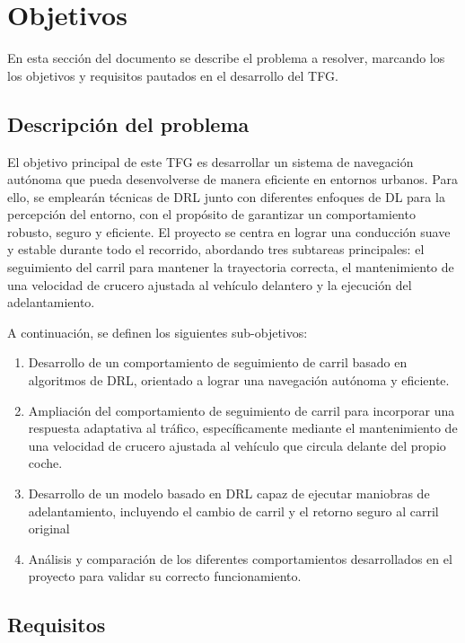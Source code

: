 \chapter{Objetivos}
\label{cap:capitulo2}

En esta sección del documento se describe el problema a resolver, marcando los los objetivos y requisitos pautados en el desarrollo del \ac{TFG}.

\section{Descripción del problema}
\label{sec:descripcion}

El objetivo principal de este \ac{TFG} es desarrollar un sistema de navegación autónoma que pueda desenvolverse de manera eficiente en entornos urbanos. Para ello, se emplearán técnicas de \ac{DRL} junto con diferentes enfoques de \ac{DL} para la percepción del entorno, con el propósito de garantizar un comportamiento robusto, seguro y eficiente. El proyecto se centra en lograr una conducción suave y estable durante todo el recorrido, abordando tres subtareas principales: el seguimiento del carril para mantener la trayectoria correcta, el mantenimiento de una velocidad de crucero ajustada al vehículo delantero y la ejecución del adelantamiento.

A continuación, se definen los siguientes sub-objetivos: 

\begin{enumerate}
    \item Desarrollo de un comportamiento de seguimiento de carril basado en algoritmos de \ac{DRL}, orientado a lograr una navegación autónoma y eficiente.
    \item Ampliación del comportamiento de seguimiento de carril para incorporar una respuesta adaptativa al tráfico, específicamente mediante el mantenimiento de una velocidad de crucero ajustada al vehículo que circula delante del propio coche.
    \item Desarrollo de un modelo basado en \ac{DRL} capaz de ejecutar maniobras de adelantamiento, incluyendo el cambio de carril y el retorno seguro al carril original
    \item Análisis y comparación de los diferentes comportamientos desarrollados en el proyecto para validar su correcto funcionamiento.
\end{enumerate}

\section{Requisitos}
\label{sec:requisitos}

